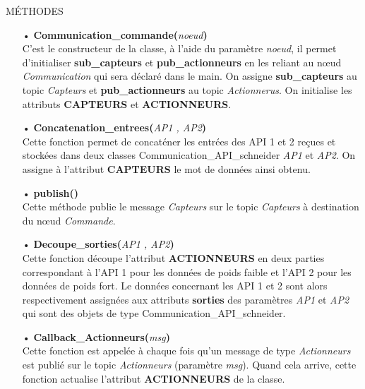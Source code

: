 \documentclass[a4paper,french, titlepage]{book}
\begin{document}
\begin{center}
MÉTHODES
\end{center}

\begin{itemize}
\item[•] \textbf{Communication\_commande(}\emph{noeud}\textbf{)}\\
C'est le constructeur de la classe, à l'aide du paramètre \emph{noeud}, il permet d'initialiser \textbf{sub\_capteurs} et \textbf{pub\_actionneurs} en les reliant au nœud \emph{Communication} qui sera déclaré dans le main. On assigne \textbf{sub\_capteurs} au topic \emph{Capteurs} et \textbf{pub\_actionneurs} au topic \emph{Actionnerus}. On initialise les attributs \textbf{CAPTEURS} et \textbf{ACTIONNEURS}.
\item[ ]
\item[•] \textbf{Concatenation\_entrees(}\emph{AP1 , AP2}\textbf{)}\\
Cette fonction permet de concaténer les entrées des API 1 et 2 reçues et stockées dans deux classes Communication\_API\_schneider \emph{AP1} et \emph{AP2}. On assigne à l'attribut \textbf{CAPTEURS} le mot de données ainsi obtenu.
\item[ ]
\item[•] \textbf{publish()}\\
Cette méthode publie le message \emph{Capteurs} sur le topic \emph{Capteurs} à destination du nœud \emph{Commande}.
\item[ ]
\item[•] \textbf{Decoupe\_sorties(}\emph{AP1 , AP2}\textbf{)}\\
Cette fonction découpe l'attribut \textbf{ACTIONNEURS} en deux parties correspondant à l'API 1 pour les données de poids faible et l'API 2 pour les données de poids fort. Le données concernant les API 1 et 2 sont alors respectivement assignées aux attributs \textbf{sorties} des paramètres \emph{AP1} et \emph{AP2} qui sont des objets de type Communication\_API\_schneider.
\item[ ]
\item[•] \textbf{Callback\_Actionneurs(}\emph{msg}\textbf{)}\\
Cette fonction est appelée à chaque fois qu'un message de type \emph{Actionneurs} est publié sur le topic \emph{Actionneurs} (paramètre \emph{msg}). Quand cela arrive, cette fonction actualise l'attribut \textbf{ACTIONNEURS} de la classe.

\end{itemize}
\end{document}

